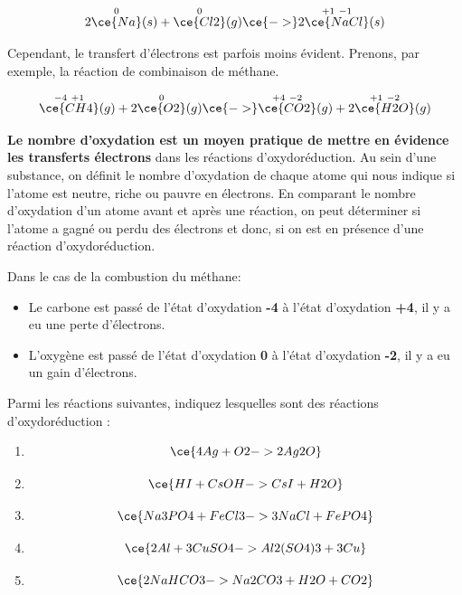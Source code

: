\documentclass[
  11pt,
  a4paper,
  openany]{book}
\providecommand{\tightlist}{%
  \setlength{\itemsep}{0pt}\setlength{\parskip}{0pt}}
\begin{document}
\[
2\overset{0}{\ce{Na}}(s) + \overset{0}{\ce{Cl2}}(g) \ce{->} 2\overset{+1\ -1}{\ce{NaCl}}(s)
\]

Cependant, le transfert d'électrons est parfois moins évident. Prenons, par exemple, la réaction de combinaison de méthane.

\[
\overset{-4\ +1}{\ce{CH4}}(g) + 2\overset{0}{\ce{O2}}(g) \ce{->} \overset{+4\ -2}{\ce{CO2}}(g) + 2\overset{+1\ -2}{\ce{H2O}}(g)
\]

\textbf{Le nombre d'oxydation est un moyen pratique de mettre en évidence les transferts électrons} dans les réactions d'oxydoréduction. Au sein d'une substance, on définit le nombre d'oxydation de chaque atome qui nous indique si l'atome est neutre, riche ou pauvre en électrons. En comparant le nombre d'oxydation d'un atome avant et après une réaction, on peut déterminer si l'atome a gagné ou perdu des électrons et donc, si on est en présence d'une réaction d'oxydoréduction.

Dans le cas de la combustion du méthane:

\begin{itemize}
\tightlist
\item
  Le carbone est passé de l'état d'oxydation \textbf{-4} à l'état d'oxydation \textbf{+4}, il y a eu une perte d'électrons.
\item
  L'oxygène est passé de l'état d'oxydation \textbf{0} à l'état d'oxydation \textbf{-2}, il y a eu un gain d'électrons.
\end{itemize}

\begin{Exercise}

Parmi les réactions suivantes, indiquez lesquelles sont des réactions d'oxydoréduction :

\begin{enumerate}
\def\labelenumi{\alph{enumi}.}
\tightlist
\item
  \[
  \ce{4 Ag + O2 -> 2 Ag2O}
  \]
\item
  \[
  \ce{HI + CsOH -> CsI + H2O}
  \]
\item
  \[
  \ce{Na3PO4 + FeCl3 -> 3 NaCl + FePO4}
  \]
\item
  \[
  \ce{2 Al + 3 CuSO4 -> Al2(SO4)3 + 3 Cu}
  \]
\item
  \[
  \ce{2 NaHCO3 -> Na2CO3 + H2O + CO2}
  \]
\end{enumerate}

\end{Exercise}
\end{document}
